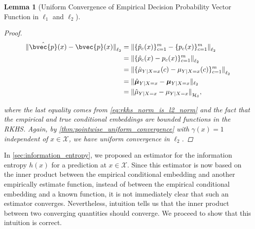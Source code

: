 \documentclass{article}
\newtheorem{lemma}[theorem]{Lemma}
\begin{document}
\begin{lemma}[Uniform Convergence of Empirical Decision Probability Vector Function in $\ell_{1}$ and $\ell_{2}$]
\begin{proof}
			\begin{equation}
			\begin{aligned}
				{\lVert \hat{\bvec{p}}(x)  - \bvec{p}(x) \rVert}_{\ell_{2}} &= {\lVert \{ \hat{p}_{c}(x) \}_{c = 1}^{m} - \{ p_{c}(x) \}_{c = 1}^{m} \rVert}_{\ell_{2}} \\
				&= {\lVert \{ \hat{p}_{c}(x) - p_{c}(x) \}_{c = 1}^{m} \rVert}_{\ell_{2}} \\
				&= {\lVert \{ \hat{\mu}_{Y | X = x}(c) - \mu_{Y | X = x}(c)\}_{c = 1}^{m} \rVert}_{\ell_{2}} \\
				&= \| \hat{\bm{\mu}}_{Y | X = x} - \bm{\mu}_{Y | X = x}  \|_{\ell_{2}} \\
				&= {\lVert \hat{\mu}_{Y | X = x} - \mu_{Y | X = x}\rVert}_{\mathcal{H}_{\delta}},
			\end{aligned}
			\end{equation}
			
			where the last equality comes from \eqref{eq:rkhs_norm_is_l2_norm} and the fact that the empirical and true conditional embeddings are bounded functions in the RKHS. Again, by \cref{thm:pointwise_uniform_convergence} with $\gamma(x) = 1$ independent of $x \in \mathcal{X}$, we have uniform convergence in $\ell_{2}$.
		\end{proof}
	\end{lemma}
		
	In \cref{sec:information_entropy}, we proposed an estimator for the information entropy $h(x)$ for a prediction at $x \in \mathcal{X}$. Since this estimator is now based on the inner product between the empirical conditional embedding and another empirically estimate function, instead of between the empirical conditional embedding and a known function, it is not immediately clear that such an estimator converges. Nevertheless, intuition tells us that the inner product between two converging quantities should converge. We proceed to show that this intuition is correct.
	
\end{document}
